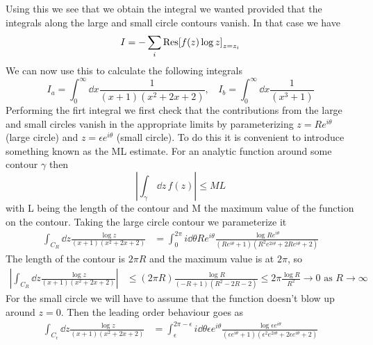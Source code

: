 \documentclass[a4paper,12pt]{article}
\begin{document}
Using this we see that we obtain the integral we wanted provided that the integrals along the large and small circle contours vanish.
In that case we have
\begin{equation}
I=-\sum_{i}\Res[f(z)\log z]_{z=z_i}
\end{equation}
 We can now use this to calculate the following integrals
\begin{equation}
I_a=\int_0^\infty \dd x \frac{1}{(x+1)(x^2+2x+2)},~~~~I_b=\int_0^\infty\dd x \frac{1}{(x^3+1)}
\end{equation}
Performing the firt integral we first check that the contributions from the large and small circles vanish in the appropriate limits by parameterizing $z=Re^{i\theta}$ (large circle) and $z=\epsilon e^{i\theta}$ (small circle). To do this it is convenient to introduce something known as the ML estimate. For an analytic function around some contour $\gamma$ then 
\begin{equation}
\left|\int_\gamma\,\dd z\, f(z)\right|\leq M L
\end{equation}
with L being the length of the contour and M the maximum value of the function on the contour. Taking the large circle contour we parameterize it
\begin{equation}
\begin{aligned}
\int_{C_R} \dd z \frac{\log z}{(x+1)(x^2+2x+2)}&=\int_{0}^{2\pi} i\dd \theta R e^{i\theta} \frac{\log Re^{i\theta}}{(Re^{i\theta}+1)(R^2e^{2i\theta}+2Re^{i\theta}+2)}
\end{aligned}
\end{equation}
The length of the contour is $2\pi R$ and the maximum value is at $2\pi$, so
\begin{equation}
	\begin{aligned}
	 \left|\int_{C_R} \dd z \frac{\log z}{(x+1)(x^2+2x+2)}\right|&\leq(2\pi R)
	 \frac{\log R}{(-R+1)(R^2-2R-2)}\leq2\pi \frac{\log R}{R^2}\to 0 \text{ as } R\to\infty
	\end{aligned}
\end{equation}
For the small circle we will have to assume that the function doesn't blow up around $z=0$. Then the leading order behaviour goes as
\begin{equation}
	\begin{aligned}
		\int_{C_\epsilon} \dd z \frac{\log z}{(x+1)(x^2+2x+2)}&=\int_{\epsilon}^{2\pi-\epsilon} i\dd \theta \epsilon e^{i\theta} \frac{\log \epsilon e^{i\theta}}{(\epsilon e^{i\theta}+1)(\epsilon ^2e^{2i\theta}+2\epsilon e^{i\theta}+2)}\\
			\end{aligned}
	\end{equation}
\end{document}
